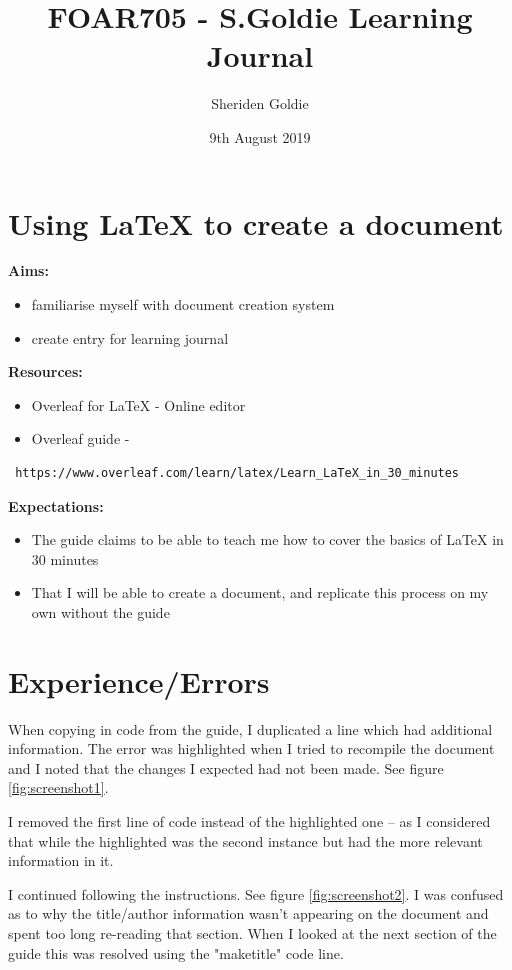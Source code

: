 \documentclass{article}
\title{FOAR705 - S.Goldie Learning Journal}
\author{Sheriden Goldie}
\date{9th August 2019}
\begin{document}
\maketitle

\section*{Using LaTeX to create a document}

\textbf{Aims:}
\begin{itemize}
    \item familiarise myself with document creation system
    \item create entry for learning journal
    \end{itemize}

\textbf{Resources:}
\begin{itemize}
    \item Overleaf for LaTeX - Online editor
    \item Overleaf guide - 
    \end{itemize}
\begin{verbatim} https://www.overleaf.com/learn/latex/Learn_LaTeX_in_30_minutes \end{verbatim}

\textbf{Expectations:}
\begin{itemize}
    \item The guide claims to be able to teach me how to cover the basics of LaTeX in 30 minutes
    \item That I will be able to create a document, and replicate this process on my own without the guide
\end{itemize}


\section*{Experience/Errors}

When copying in code from the guide, I duplicated a line which had additional information. The error was highlighted when I tried to recompile the document and I noted that the changes I expected had not been made.
See figure \ref{fig:screenshot1}.

I removed the first line of code instead of the highlighted one – as I considered that while the highlighted was the second instance but had the more relevant information in it.

I continued following the instructions. See figure \ref{fig:screenshot2}.
I was confused as to why the title/author information wasn’t appearing on the document and spent too long re-reading that section. When I looked at the next section of the guide this was resolved using the "maketitle" code line.
\end{document}
